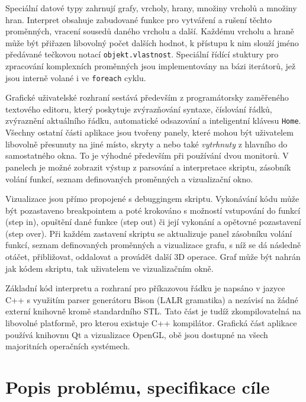 \documentclass[11pt,twoside,a4paper]{book}
\begin{document}
Speciální datové typy zahrnují grafy, vrcholy, hrany, množiny vrcholů a množiny hran. Interpret obsahuje zabudované funkce pro vytváření a rušení těchto proměnných, vracení sousedů daného vrcholu a další. Každému vrcholu a hraně může být přiřazen libovolný počet dalších hodnot, k přístupu k nim slouží jméno předávané tečkovou notací \texttt{objekt.vlastnost}. Speciální řídící stuktury pro zpracování komplexních proměnných jsou implementovány na bázi iterátorů, jež jsou interně volané i ve \texttt{foreach} cyklu.

Grafické uživatelské rozhraní sestává především z programátorsky zaměřeného textového editoru, který poskytuje zvýrazňování syntaxe, číslování řádků, zvýraznění aktuálního řádku, automatické odsazování a inteligentní klávesu \texttt{Home}. Všechny ostatní části aplikace jsou tvořeny panely, které mohou být uživatelem libovolně přesunuty na jiné místo, skryty a nebo také \textit{vytrhnuty} z hlavního do samostatného okna. To je výhodné především při používání dvou monitorů. V panelech je možné zobrazit výstup z parsování a interpretace skriptu, zásobník volání funkcí, seznam definovaných proměnných a vizualizační okno.

Vizualizace jsou přímo propojené s debuggingem skriptu. Vykonávání kódu může být pozastaveno breakpointem a poté krokováno s možností vstupování do funkcí (step in), opuštění dané funkce (step out) či její vykonání a opětovné pozastavení (step over). Při každém zastavení skriptu se aktualizuje panel zásobníku volání funkcí, seznam definovaných proměnných a vizualizace grafu, s níž se dá následně otáčet, přibližovat, oddalovat a provádět další 3D operace. Graf může být nahrán jak kódem skriptu, tak uživatelem ve vizualizačním okně.

Základní kód interpretu a rozhraní pro příkazovou řádku je napsáno v jazyce C++ s využitím parser generátoru Bison (LALR gramatika) a nezávisí na žádné externí knihovně kromě standardního STL. Tato část je tudíž zkompilovatelná na libovolné platformě, pro kterou existuje C++ kompilátor. Grafická část aplikace používá knihovnu Qt a vizualizace OpenGL, obě jsou dostupné na všech majoritních operačních systémech.



\chapter{Popis problému, specifikace cíle}
\end{document}
